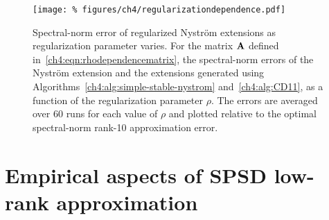 \begin{figure}[ht]
 \centering
 \texttt{[image: \%
figures/ch4/regularizationdependence.pdf]}
 \caption[Spectral-norm error of regularized Nystr\"om extensions as regularization parameter varies]{%
{\sc Spectral-norm error of regularized Nystr\"om extensions as regularization parameter varies.} 
For the matrix $\mathbf{A}$ defined in~\eqref{ch4:eqn:rhodependencematrix},
the spectral-norm errors of the Nystr\"om extension and the extensions
generated using Algorithms~\ref{ch4:alg:simple-stable-nystrom}
and~\ref{ch4:alg:CD11}, as a function of
the regularization parameter $\rho.$ The errors are averaged over 60 runs for
each value of $\rho$ and plotted relative to the optimal spectral-norm rank-10 approximation error.}
 \label{ch4:fig:regularization}
\end{figure}


\section{Empirical aspects of SPSD low-rank approximation}
\label{ch4:sxn:emp}

